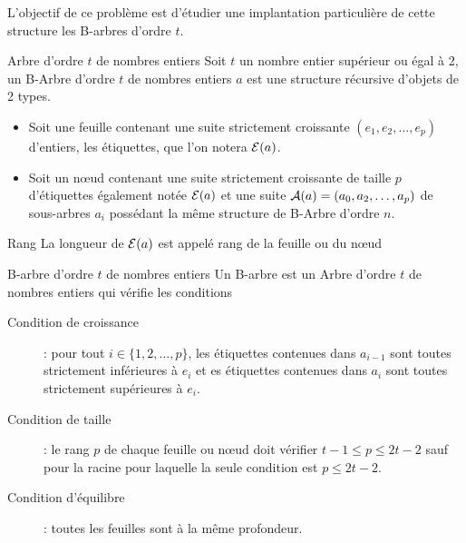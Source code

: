 L’objectif de ce problème est d’étudier une implantation particulière de cette structure les B-arbres d'ordre $t$.
\begin{defin}{Arbre d’ordre $t$ de nombres entiers}
Soit $t$ un nombre entier supérieur ou égal à 2, un B-Arbre d’ordre $t$ de nombres entiers $a$ est une structure récursive d'objets de 2 types.
\begin{itemize}
    \item Soit une feuille contenant une suite strictement croissante $(e_1, e_2, \ldots, e_p)$ d'entiers, les étiquettes, que l'on notera ${\cal E}(a)$. 
    \item Soit un nœud contenant une suite strictement croissante de taille $p$ d’étiquettes également notée ${\cal E}(a)$  et une suite ${\cal A}(a) = (a_0 , a_2, \ldots, a_p)$ de sous-arbres $a_i$ possédant la même structure de B-Arbre d’ordre $n$.
\end{itemize}
\end{defin}
\begin{defin}{Rang}
La longueur de ${\cal E}(a)$ est appelé rang de la feuille ou du nœud
\end{defin}
\begin{defin}{B-arbre d’ordre $t$ de nombres entiers}
Un B-arbre est un Arbre d’ordre $t$ de nombres entiers qui vérifie les conditions

\begin{description}
\item[Condition de croissance]  : pour tout $i\in \{1,2, \ldots, p\}$, les étiquettes contenues dans $a_{i-1}$ sont toutes strictement inférieures à $e_i$ et es étiquettes contenues dans $a_i$ sont toutes strictement supérieures à $e_i$.
\item[Condition de taille] : le rang $p$ de chaque feuille ou nœud doit vérifier $t-1 \le p\le 2t-2$ sauf pour la racine pour laquelle la seule condition est $p\le 2t-2$.
\item[Condition d'équilibre] : toutes les feuilles sont à la même profondeur.
\end{description}
\end{defin}

